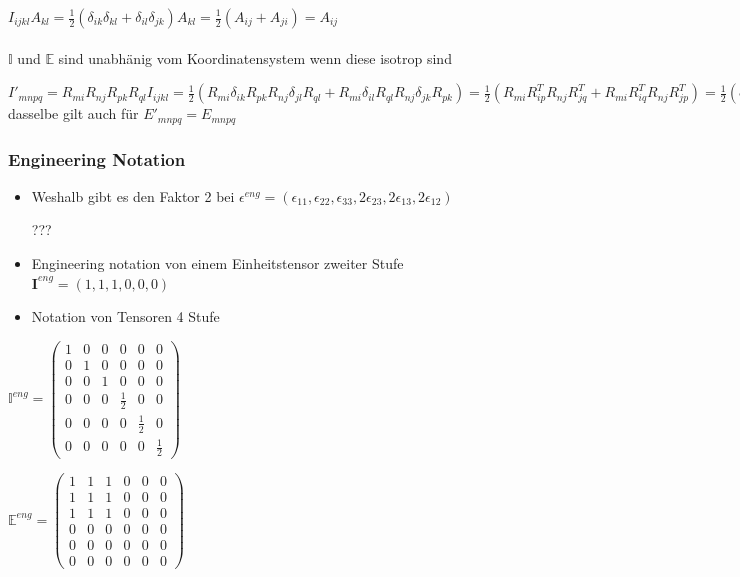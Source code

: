 \documentclass[a4paper]{scrartcl}
\begin{document}
$I_{ijkl}A_{kl}=\frac{1}{2}(\delta_{ik}\delta_{kl}+\delta_{il}\delta_{jk})A_{kl}=\frac{1}{2}(A_{ij}+A_{ji})=A_{ij}$
\\
\\
$ \mathbb{I} $ und $ \mathbb{E} $ sind unabhänig vom Koordinatensystem wenn diese isotrop sind

$ I'_{mnpq}=R_{mi}R_{nj}R_{pk}R_{ql}I_{ijkl} = \frac{1}{2}(R_{mi}\delta_{ik}R_{pk}R_{nj}\delta_{jl}R_{ql} + R_{mi}\delta_{il}R_{ql}R_{nj}\delta_{jk}R_{pk})= \frac{1}{2}(R_{mi}R^T_{ip}R_{nj}R^T_{jq}+R_{mi}R^T_{iq}R_{nj}R^T_{jp})= \frac{1}{2}(\delta_{mp}\delta_{mq}\delta_{np})=I_{mnpq} $ dasselbe gilt auch für $ E'_{mnpq}=E_{mnpq}$


\subsubsection{Engineering Notation}
\begin{itemize}
\item Weshalb gibt es den Faktor 2 bei $ \epsilon^{eng}=(\epsilon_{11},\epsilon_{22},\epsilon_{33},2\epsilon_{23},2\epsilon_{13},2\epsilon_{12}) $

???


\item Engineering notation von einem Einheitstensor zweiter Stufe
$ \textbf{I}^{eng}=(1,1,1,0,0,0) $


\item Notation von Tensoren 4 Stufe

\end{itemize}
$ \mathbb{I}^{eng}=
\begin{pmatrix}
1 & 0 & 0 & 0 & 0 & 0 \\ 
0 & 1 & 0 & 0 & 0 & 0 \\ 
0 & 0 & 1 & 0 & 0 & 0 \\ 
0 & 0 & 0 & \frac{1}{2} & 0 & 0 \\ 
0 & 0 & 0 & 0 & \frac{1}{2} & 0 \\ 
0 & 0 & 0 & 0 & 0 & \frac{1}{2}
\end{pmatrix} 
$

$
\mathbb{E}^{eng}=
\begin{pmatrix}
1 & 1 & 1 & 0 & 0 & 0 \\ 
1 & 1 & 1 & 0 & 0 & 0 \\ 
1 & 1 & 1 & 0 & 0 & 0 \\ 
0 & 0 & 0 & 0 & 0 & 0 \\ 
0 & 0 & 0 & 0 & 0 & 0 \\ 
0 & 0 & 0 & 0 & 0 & 0
\end{pmatrix} 
$
\end{document}
